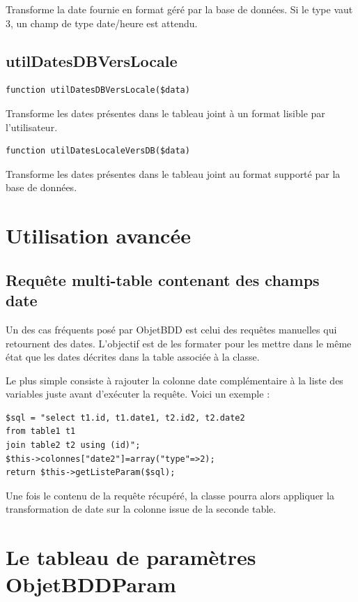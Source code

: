 Transforme la date fournie en format géré par la base de données. Si le type vaut 3, un champ de type date/heure est attendu.

\subsection{utilDatesDBVersLocale}
\begin{lstlisting}
function utilDatesDBVersLocale($data)
\end{lstlisting}

Transforme les dates présentes dans le tableau joint à un format lisible par l'utilisateur.

\begin{lstlisting}
function utilDatesLocaleVersDB($data)
\end{lstlisting}

Transforme les dates présentes dans le tableau joint au format supporté par la base de données.

\section{Utilisation avancée}
\subsection{Requête multi-table contenant des champs date}
Un des cas fréquents posé par ObjetBDD est celui des requêtes manuelles qui retournent des dates. L'objectif est de les formater pour les mettre dans le même état que les dates décrites dans la table associée à la classe.

Le plus simple consiste à rajouter la colonne date complémentaire à la liste des variables juste avant d'exécuter la requête. Voici un exemple :
\begin{lstlisting}
$sql = "select t1.id, t1.date1, t2.id2, t2.date2
from table1 t1
join table2 t2 using (id)";
$this->colonnes["date2"]=array("type"=>2);
return $this->getListeParam($sql);
\end{lstlisting}

Une fois le contenu de la requête récupéré, la classe pourra alors appliquer la transformation de date sur la colonne issue de la  seconde table.

\section{Le tableau de paramètres ObjetBDDParam}\label{objetbddparam}

